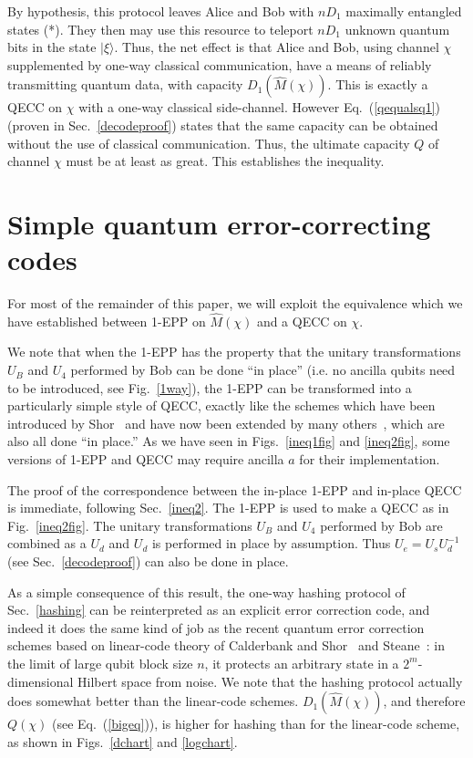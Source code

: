 By hypothesis, this protocol leaves Alice and Bob with $nD_1$ maximally
entangled states (*).  They then may use this resource to teleport
$nD_1$ unknown quantum bits in the state $|\xi\rangle$.  Thus, the
net effect is that Alice and Bob, using channel $\chi$ supplemented
by one-way classical communication, have a means
of reliably transmitting quantum data, with capacity $D_1(\hat{M}(\chi))$.
This is exactly a QECC on $\chi$ with a one-way classical side-channel.
However Eq.~(\ref{qequalsq1}) (proven in Sec.~\ref{decodeproof})
states that the same capacity can
be obtained without the use of classical communication. 
Thus, the ultimate capacity $Q$ of channel $\chi$ must be at least
as great.  This establishes the inequality.
 
\section{Simple quantum error-correcting codes}
\label{simplecode}
 
For most of the remainder of this paper, we will exploit the
equivalence which we have established between 1-EPP on $\hat{M}(\chi)$
and a QECC on $\chi$.  
 
We note that when the 1-EPP has the property that
the unitary transformations
$U_B$ and $U_4$ performed by Bob can be done ``in place''
(i.e. no ancilla qubits need to be introduced, see Fig.~\ref{1way}),
the 1-EPP can be transformed into a particularly simple style
of QECC, exactly like the schemes which have been introduced by
Shor~\cite{shellgame} and have now been extended by many
others~\cite{CS,Steane,Laflamme,EM,Sam,balance,newest}, which are also
all done ``in place.'' 
As we have seen in Figs.~\ref{ineq1fig}
and \ref{ineq2fig}, some versions of 1-EPP and QECC may require 
ancilla $a$ for their implementation. 
 
The proof of the correspondence between the in-place 1-EPP
and in-place QECC is immediate, following Sec.~\ref{ineq2}.
The 1-EPP is used to make a QECC as in Fig.~\ref{ineq2fig}.  The unitary
transformations $U_B$ and $U_4$ performed by Bob are combined as 
a $U_d$ and $U_d$ is performed in place by assumption.  
Thus $U_e=U_s U_d^{-1}$ (see Sec.~\ref{decodeproof}) can also 
be done in place.  
 
As a simple consequence of this result, the one-way hashing protocol
of Sec.~\ref{hashing} can be reinterpreted as an explicit error
correction code, and indeed it does the same kind of job as the recent
quantum error correction schemes based on linear-code theory of
Calderbank and Shor~\cite{CS} and Steane~\cite{Steane}: in the limit of
large qubit block size $n$, it protects an arbitrary state in a
$2^m$-dimensional Hilbert space from noise.  
We note that the hashing protocol actually does somewhat better
than the linear-code schemes.  $D_1(\hat{M}(\chi))$, and therefore
$Q(\chi)$ (see Eq.~(\ref{bigeq})),
is higher for hashing than for the linear-code scheme,
as shown in Figs.~\ref{dchart} and \ref{logchart}.
 
